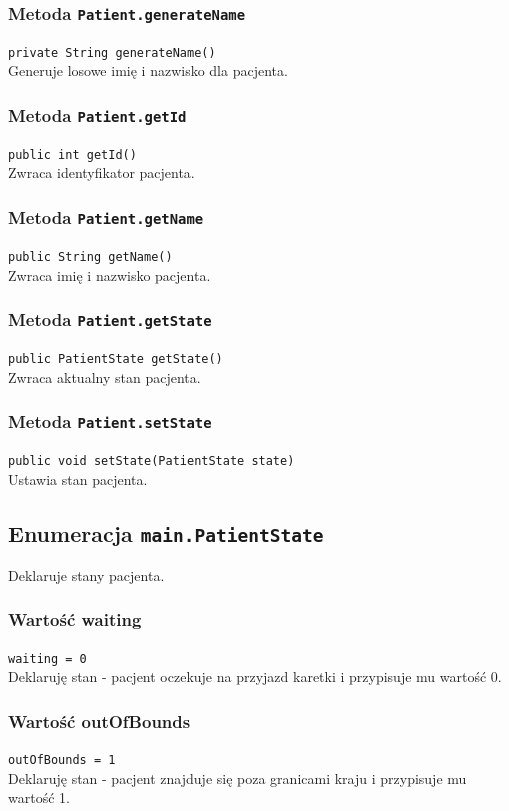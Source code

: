 \documentclass{article}
\begin{document}
\subsubsection{Metoda \texttt{Patient.generateName}}
\texttt{private String generateName()} \\
Generuje losowe imię i nazwisko dla pacjenta. 

\subsubsection{Metoda \texttt{Patient.getId}}
\texttt{public int getId()} \\
Zwraca identyfikator pacjenta.

\subsubsection{Metoda \texttt{Patient.getName}}
\texttt{public String getName()} \\
Zwraca imię i nazwisko pacjenta.

\subsubsection{Metoda \texttt{Patient.getState}}
\texttt{public PatientState getState()} \\
Zwraca aktualny stan pacjenta.

\subsubsection{Metoda \texttt{Patient.setState}}
\texttt{public void setState(PatientState state)} \\
Ustawia stan pacjenta.

\subsection{Enumeracja \texttt{main.PatientState}}
Deklaruje stany pacjenta. \\

\subsubsection{Wartość waiting}
\texttt{waiting = 0} \\
Deklaruję stan - pacjent oczekuje na przyjazd karetki i przypisuje mu wartość 0.

\subsubsection{Wartość outOfBounds}
\texttt{outOfBounds = 1} \\
Deklaruję stan - pacjent znajduje się poza granicami kraju i przypisuje mu wartość 1.
\end{document}
